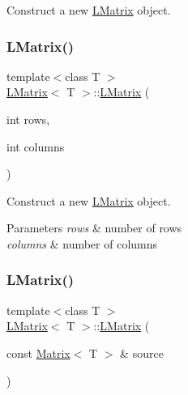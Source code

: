 Construct a new \mbox{\hyperlink{class_l_matrix}{L\+Matrix}} object. 

\mbox{\label{class_l_matrix_a5e031d95fcb4ce79894c52488d224f98}} 
\subsubsection{\texorpdfstring{LMatrix()}{LMatrix()}\hspace{0.1cm}{\footnotesize\ttfamily [2/4]}}
{\footnotesize\ttfamily template$<$class T $>$ \\
\mbox{\hyperlink{class_l_matrix}{L\+Matrix}}$<$ T $>$\+::\mbox{\hyperlink{class_l_matrix}{L\+Matrix}} (\begin{DoxyParamCaption}\item[{int}]{rows,  }\item[{int}]{columns }\end{DoxyParamCaption})}



Construct a new \mbox{\hyperlink{class_l_matrix}{L\+Matrix}} object. 


\begin{DoxyParams}{Parameters}
{\em rows} & number of rows \\
\hline
{\em columns} & number of columns \\
\hline
\end{DoxyParams}
\mbox{\label{class_l_matrix_aa4bc8aa349207a09c467d958d7361b4b}} 
\subsubsection{\texorpdfstring{LMatrix()}{LMatrix()}\hspace{0.1cm}{\footnotesize\ttfamily [3/4]}}
{\footnotesize\ttfamily template$<$class T $>$ \\
\mbox{\hyperlink{class_l_matrix}{L\+Matrix}}$<$ T $>$\+::\mbox{\hyperlink{class_l_matrix}{L\+Matrix}} (\begin{DoxyParamCaption}\item[{const \mbox{\hyperlink{class_matrix}{Matrix}}$<$ T $>$ \&}]{source }\end{DoxyParamCaption})}



